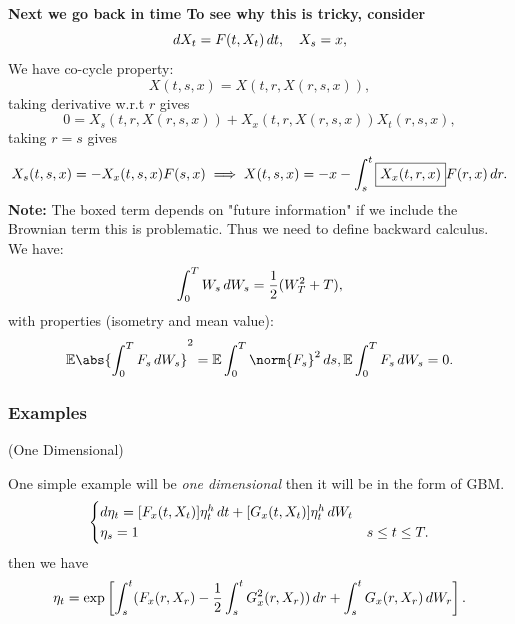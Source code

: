 \textbf{Next we go back in time To see why this is tricky, consider}   
\begin{equation*}
    \mathop{}\!d X_t = F(t,X_t) \mathop{}\!d t, \quad X_s = x,
\end{equation*} We have co-cycle property:
\begin{equation*}
    X(t,s,x) = X(t,r,X(r,s,x)),
\end{equation*}
taking derivative w.r.t $r$ gives
\begin{equation*}
    0 = X_s(t,r,X(r,s,x)) + X_x(t,r,X(r,s,x))X_t(r,s,x),
\end{equation*}
taking $r=s$ gives
\begin{equation*}
    X_s(t,s,x) =- X_x(t,s,x)F(s,x) \implies X(t,s,x) = -x -\int_s^t  \boxed{X_x(t,r,x)}F(r,x) \mathop{}\!d r.
\end{equation*}
\textbf{Note: }The boxed term depends on "future information" if we include the Brownian term this is problematic. Thus we need to define backward \ito calculus. We have:
\begin{equation*}
    \int_0^T W_s \mathop{}\!d W_s = \frac{1}{2}(W_T^2 + T),
\end{equation*}
with properties (\ito isometry and mean value):
\begin{align*}
    \E\abs{\int_0^T F_s \diff W_s}^2 = \E \int_0^T \norm{F_s}^2 \diff s, \E\int_0^T F_s \diff W_s = 0.
\end{align*}

\subsubsection{Examples}
\begin{example}{(One Dimensional)}

One simple example will be \textit{one dimensional} then it will be in the form of GBM.
\begin{equation*}
    \begin{cases}
    \mathop{}\!d \eta_t = [F_x(t,X_t)]\eta_t^h \mathop{}\!d t + [G_x(t,X_t)]\eta_t^h \mathop{}\!d W_t \\
    \eta_s = 1 &s\leq t\leq T.
    \end{cases}
\end{equation*}
then we have
\begin{equation*}
    \eta_t = \exp \left[\int_s^t(F_x(r,X_r) - \frac{1}{2} \int_s^t G_x^2(r,X_r)) \mathop{}\!d r + \int_s^t G_x(r,X_r) \mathop{}\!d W_r \right].
\end{equation*}
\end{example}

